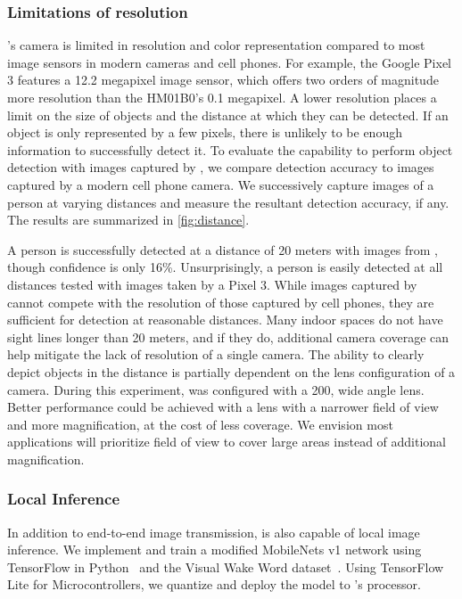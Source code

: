 \subsubsection{Limitations of resolution}
\name{}'s camera is limited in resolution and color representation compared to most image sensors in modern cameras and cell phones. For example, the Google Pixel 3 features a 12.2 megapixel image sensor, which offers two orders of magnitude more resolution than the HM01B0's 0.1 megapixel. A lower resolution places a limit on the size of objects and the distance at which they can be detected. If an object is only represented by a few pixels, there is unlikely to be enough information to successfully detect it. To evaluate the capability to perform object detection with images captured by \name{}, we compare detection accuracy to images captured by a modern cell phone camera. We successively capture images of a person at varying distances and measure the resultant detection accuracy, if any. The results are summarized in \cref{fig:distance}.

A person is successfully detected at a distance of 20 meters with images from \name{}, though confidence is only 16\%. Unsurprisingly, a person is easily detected at all distances tested with images taken by a Pixel 3. While images captured by \name{} cannot compete with the resolution of those captured by cell phones, they are sufficient for detection at reasonable distances. Many indoor spaces do not have sight lines longer than 20 meters, and if they do, additional camera coverage can help mitigate the lack of resolution of a single camera. The ability to clearly depict objects in the distance is partially dependent on the lens configuration of a camera. During this experiment, \name{} was configured with a 200\textdegree\xspace, wide angle lens. Better performance could be achieved with a lens with a narrower field of view and more magnification, at the cost of less coverage. We envision most applications will prioritize field of view to cover large areas instead of additional magnification.


\subsubsection{Local Inference}
\label{eval:localinf}
In addition to end-to-end image transmission, \name is also capable of local image inference. We implement and train a modified MobileNets v1 network using TensorFlow in Python~\cite{tensorflow2015-whitepaper} and the Visual Wake Word dataset~\cite{chowdhery2019visual}. Using TensorFlow Lite for Microcontrollers, we quantize and deploy the model to \name's processor.

